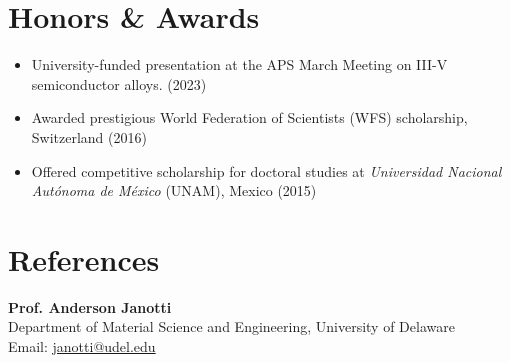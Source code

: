 \documentclass[letter,11pt]{article}
\begin{document}
\section{Honors \& Awards}
\begin{itemize}
\item University-funded presentation at the APS March Meeting on III-V semiconductor alloys. (2023)
\item Awarded prestigious World Federation of Scientists (WFS) scholarship, Switzerland (2016)
\item Offered competitive scholarship for doctoral studies at \textit{Universidad Nacional Autónoma de México} (UNAM), Mexico (2015)
\end{itemize}

\section{References}
\textbf{Prof. Anderson Janotti} \\
Department of Material Science and Engineering, University of Delaware \\
Email: \href{mailto:janotti@udel.edu}{janotti@udel.edu}
\end{document}
